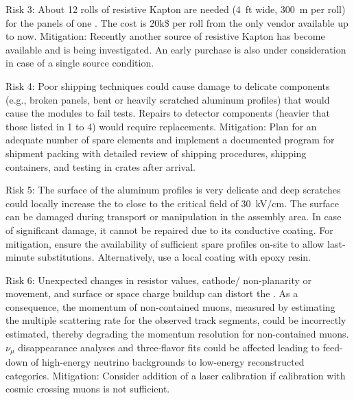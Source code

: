 Risk 3: About 12 rolls of resistive Kapton are needed (\SI{4}{ft} wide, \SI{300}{m} per roll)  for the  panels of one .  The cost is 20k\$ per roll from the only vendor available up to now. Mitigation: Recently another source of resistive Kapton has become available and is being investigated. An early purchase is also under consideration in case of a single source condition.

Risk 4: Poor shipping techniques could cause damage to delicate components (e.g., broken  panels, bent or heavily scratched aluminum profiles) that would cause the modules to fail  tests. %
Repairs to detector components (heavier that those listed in 1 to 4) would require replacements.   Mitigation: Plan for an adequate number of spare elements and implement %
a documented  program for shipment packing with detailed review of shipping procedures, shipping containers, and testing in crates after arrival.

Risk 5: The surface of the aluminum profiles is very delicate and deep scratches could locally increase the \efield to close to the critical field of \SI{30}{\kV}/cm. The surface can be damaged during transport or manipulation in the assembly area. In case of significant damage, it cannot be repaired due to its conductive coating. For mitigation, ensure the availability of sufficient spare profiles %
on-site to allow last-minute substitutions. Alternatively, use a local coating with epoxy resin. %

Risk 6: Unexpected changes in  resistor values, cathode/ non-planarity or movement, and surface or space charge buildup can distort the \efield. As a consequence, the momentum of non-contained muons,  measured by estimating the multiple scattering rate for the observed track segments, could be incorrectly estimated, thereby degrading %
the momentum resolution for non-contained muons.  ${\nu}_{\mu}$ disappearance analyses and three-flavor fits could be affected %
leading to feed-down of high-energy neutrino backgrounds to low-energy reconstructed categories.  Mitigation: Consider addition of a laser calibration %
if calibration with cosmic crossing muons is not sufficient. 

